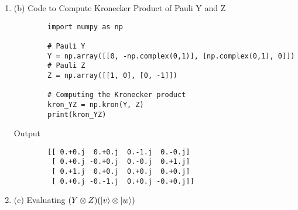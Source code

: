 \documentclass[a4paper,12pt]{article}
\begin{document}
\begin{enumerate}[label=(\alph*)]
    \item (b) Code to Compute Kronecker Product of Pauli Y and Z

          \begin{lstlisting}
        import numpy as np
        
        # Pauli Y
        Y = np.array([[0, -np.complex(0,1)], [np.complex(0,1), 0]])
        # Pauli Z
        Z = np.array([[1, 0], [0, -1]])
        
        # Computing the Kronecker product
        kron_YZ = np.kron(Y, Z)
        print(kron_YZ)
        \end{lstlisting}
          \hspace{10mm}Output
          \begin{lstlisting}
        [[ 0.+0.j  0.+0.j  0.-1.j  0.-0.j]
         [ 0.+0.j -0.+0.j  0.-0.j  0.+1.j]
         [ 0.+1.j  0.+0.j  0.+0.j  0.+0.j]
         [ 0.+0.j -0.-1.j  0.+0.j -0.+0.j]]
        \end{lstlisting}

    \item
          \vspace{5mm}
          \begin{flushleft}
              (c) \hspace{3mm}Evaluating $ (Y \otimes Z)(\ket{v} \otimes \ket{w})$
          \end{flushleft}


\end{enumerate}
\end{document}
